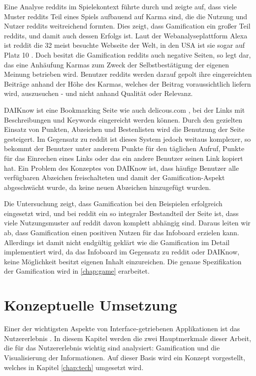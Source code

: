 \documentclass[12pt,twoside]{book}
\begin{document}
Eine Analyse reddits im Spielekontext führte \cite{massanari2013playful} durch und zeigte auf, dass viele Muster reddits Teil eines Spiels aufbauend auf Karma sind, die die Nutzung und Nutzer reddits weitreichend formten.
Dies zeigt, dass Gamification ein großer Teil reddits, und damit auch dessen Erfolgs ist. Laut der Webanalyseplattform Alexa ist reddit die 32 meist besuchte Webseite der Welt, in den USA ist sie sogar auf Platz 10 \cite{alexa}.
Doch besitzt die Gamification reddits auch negative Seiten, so legt \citep{richerichkarma}  dar, das eine Anhäufung Karmas zum Zweck der Selbstbestätigung der eigenen Meinung betrieben wird. Benutzer reddits werden darauf gepolt ihre eingereichten Beiträge anhand der Höhe des Karmas, welches der Beitrag voraussichtlich liefern wird, auszusuchen - und nicht anhand Qualität oder Relevanz.

DAIKnow \citep{meder2014daiknow} ist eine Bookmarking Seite wie auch delicous.com \cite{delicious}, bei der Links mit Beschreibungen und Keywords eingereicht werden können. Durch den gezielten Einsatz von Punkten, Abzeichen und Bestenlisten wird die Benutzung der Seite gesteigert. Im Gegensatz zu reddit ist dieses System jedoch weitaus komplexer, so bekommt der Benutzer unter anderem Punkte für den täglichen Aufruf, Punkte für das Einrechen eines Links oder das ein andere Benutzer seinen Link kopiert hat.
Ein Problem des Konzeptes von DAIKnow ist, dass häufige Benutzer alle verfügbaren Abzeichen freischalteten und damit der Gamification-Aspekt abgeschwächt wurde, da keine neuen Abzeichen hinzugefügt wurden.

Die Untersuchung zeigt, dass Gamification bei den Beispielen erfolgreich eingesetzt wird, und bei reddit ein so integraler Bestandteil der Seite ist, dass viele Nutzungsmuster auf reddit davon komplett abhängig sind. Daraus leiten wir ab, dass Gamification einen positiven Nutzen für das Infoboard erzielen kann. Allerdings ist damit nicht endgültig geklärt wie die Gamification im Detail implementiert wird, da das Infoboard im Gegensatz zu reddit oder DAIKnow, keine Möglichkeit besitzt eigenen Inhalt einzureichen. Die genaue Spezifikation der Gamification wird in \ref{chap:game} erarbeitet.

\chapter{Konzeptuelle Umsetzung}\label{chap:concept}

Einer der wichtigsten Aspekte von Interface-getriebenen Applikationen ist das Nutzererlebnis \citep[8 - 17]{garrett2010elements}. In diesem Kapitel werden die zwei Hauptmerkmale dieser Arbeit, die für das Nutzererlebnis wichtig sind analysiert: Gamification und die Visualisierung der Informationen. Auf dieser Basis wird ein Konzept vorgestellt, welches in Kapitel \ref{chap:tech} umgesetzt wird.
\end{document}

